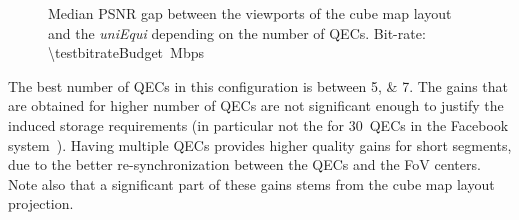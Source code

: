 \begin{figure}[htbp]
\centering

\caption{Median \acs{PSNR} gap between the viewports of the cube map layout and the \textit{uniEqui} depending
on the number of QECs.
Bit-rate: \SI{\testbitrateBudget}{\mega bps}}
\label{fig:QEC}
\end{figure}

The best number of \acp{QEC} in this configuration is between
\numlist{5;7}. The gains that are obtained for higher number of
\acp{QEC} are not significant enough to justify the induced storage
requirements (in particular not the for $30$~\acp{QEC} in the Facebook
system~\cite{facebook}). Having multiple  \acp{QEC} provides higher
quality gains for short segments, due to the better re-synchronization
between the \acp{QEC} and the \ac{FoV} centers. Note also that a
significant part of these gains stems from the cube map layout
projection.
%

